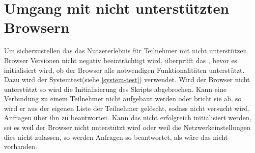 \section{Umgang mit nicht unterstützten Browsern}\label{k:unsupBrowsers}
Um sicherzustellen das das Nutzererlebnis für Teilnehmer mit nicht unterstützen Browser Versionen nicht negativ beeinträchtigt wird, überprüft das \cdn, bevor es initialisiert wird, ob der Browser alle notwendigen Funktionalitäten unterstützt. Dazu wird der Systemtest(siehe \ref{system-test}) verwendet. Wird der Browser nicht unterstützt so wird die Initialisierung des Skripts abgebrochen.
Kann eine Verbindung zu einem Teilnehmer nicht aufgebaut werden oder bricht sie ab, so wird er aus der eigenen Liste der Teilnehmer gelöscht, sodass nicht versucht wird, Anfragen über ihn zu beantworten.
Kann das \cdn nicht erfolgreich initialisiert werden, sei es weil der Browser nicht unterstützt wird oder weil die Netzwerkeinstellungen dies nicht zulassen, so werden Anfragen so beantwortet, als wäre das \cdn nicht vorhanden.

